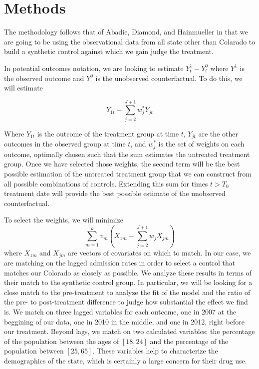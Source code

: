 \documentclass{article}
\begin{document}
\section{Methods}

The methodology follows that of Abadie, Diamond, and Hainmueller \citeyearpar{SynthControl} in that we are going to be using the observational data from all state other than Colarado to build a synthetic control against which we gain judge the treatment. 

In potential outcomes notation, we are looking to estimate $Y_{t}^1-Y_{t}^0$ where $Y^1$ is the observed outcome and $Y^0$ is the unobserved counterfactual. To do this, we will estimate

\begin{equation}
    Y_{1t}-\sum^{J+1}_{j=2}w_j^*Y_{jt}
\end{equation}

Where $Y_{1t}$ is the outcome of the treatment group at time $t$, $Y_{jt}$ are the other outcomes in the observed group at time $t$, and $w^*_j$ is the set of weights on each outcome, optimally chosen such that the sum estimates the untreated treatment group. Once we have selected those weights, the second term will be the best possible estimation of the untreated treatment group that we can construct from all possible combinations of controls. Extending this sum for times $t>T_0$ treatment date will provide the best possible estimate of the unobserved counterfactual.


To select the weights, we will minimize
\begin{equation}
    \sum^k_{m=1}v_m(X_{1m}-\sum^{J+1}_{j=2}w_jX_{jm})
\end{equation}
where $X_{1m}$ and $X_{jm}$ are vectors of covariates on which to match. In our case, we are matching on the lagged admission rates in order to select a control that matches our Colorado as closely as possible. We analyze these results in terms of their match to the synthetic control group. In particular, we will be looking for a close match to the pre-treatment to analyze the fit of the model and the ratio of the pre- to post-treatment difference to judge how substantial the effect we find is. We match on three lagged variables for each outcome, one in 2007 at the beggining of our data, one in 2010 in the middle, and one in 2012, right before our treatment. Beyond lags, we match on two calculated variables: the percentage of the population between the ages of $[18, 24]$ and the percentage of the population between $[25, 65]$. These variables help to characterize the demographics of the state, which is certainly a large concern for their drug use.
\end{document}
